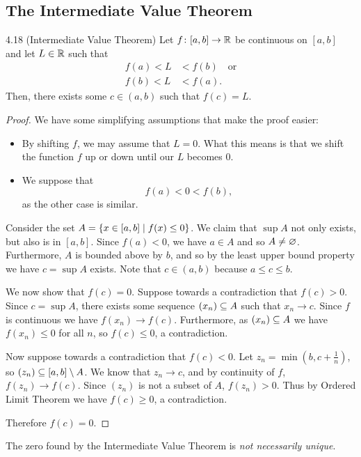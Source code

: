 \documentclass[class=article, crop=false]{standalone}
\begin{document}
  \subsection{The Intermediate Value Theorem}
  \begin{theorem}{4.18 (Intermediate Value Theorem)}
    Let $f\colon [a, b]\to \mathbb{R}$ be continuous on $[a, b]$ and let $L\in \mathbb{R}$ such that
    \begin{align*}
      f(a) < L &< f(b) \quad \text{or} \\
      f(b) < L &< f(a).
    \end{align*}
    Then, there exists some $c\in (a, b)$ such that $f(c) = L$.
    \begin{proof}
      We have some simplifying assumptions that make the proof easier:
      \begin{itemize}
        \item By shifting $f$, we may assume that $L = 0$. What this means is that we shift the function $f$ up or down until our $L$ becomes $0$.
        \item We suppose that
        \[
          f(a) < 0 < f(b),
        \]
        as the other case is similar.
      \end{itemize}
      Consider the set $A = \left\{x\in [a, b]\mid f(x)\leq 0\right\}$. We claim that $\sup A$ not only exists, but also is in $[a, b]$. Since $f(a) < 0$, we have $a\in A$ and so $A\neq \varnothing$. Furthermore, $A$ is bounded above by $b$, and so by the least upper bound property we have $c = \sup A$ exists. Note that $c\in (a, b)$ because $a\leq c\leq b$. \par
      We now show that $f(c) = 0$. Suppose towards a contradiction that $f(c) > 0$. Since $c = \sup A$, there exists some sequence $(x_n)\subseteq A$ such that $x_n\to c$. Since $f$ is continuous we have $f(x_n)\to f(c)$. Furthermore, as $(x_n)\subseteq A$ we have $f(x_n) \leq 0$ for all $n$, so $f(c) \leq 0$, a contradiction. \par
      Now suppose towards a contradiction that $f(c) < 0$. Let $z_n = \min(b, c + \frac{1}{n})$, so $(z_n)\subseteq [a, b]\setminus A$. We know that $z_n\to c$, and by continuity of $f$, $f(z_n)\to f(c)$. Since $(z_n)$ is not a subset of $A$, $f(z_n) > 0$. Thus by Ordered Limit Theorem we have $f(c) \geq 0$, a contradiction. \par
      Therefore $f(c) = 0$.
    \end{proof}
  \end{theorem}
  \begin{note}{}
    The zero found by the Intermediate Value Theorem is \emph{not necessarily unique}.
  \end{note}
\end{document}
